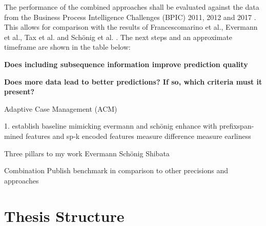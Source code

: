The performance of the combined approaches shall be evaluated against the data from the Business Process Intelligence Challenges (BPIC) 2011, 2012 and 2017 \cite{BPIC2011, BPIC2012, BPIC2017}. This allows for comparison with the results of Francescomarino et al., Evermann et al., Tax et al. and Schönig et al. \cite{francescomarino2018, evermann2016, tax2017, schoenig2018}.
The next steps and an approximate timeframe are shown in the table below:\\[1em]


\textbf{Does including subsequence information improve prediction quality}

\textbf{Does more data lead to better predictions? If so, which criteria must it present?}

Adaptive Case Management (ACM)

1. establish baseline mimicking evermann and schönig
enhance with prefixspan-mined features and sp-k encoded features
measure difference
measure earliness

Three pillars to my work
Evermann
Schönig
Shibata

Combination
Publish benchmark in comparison to other precisions and approaches

\section{Thesis Structure}\label{sec:intro:structure}


